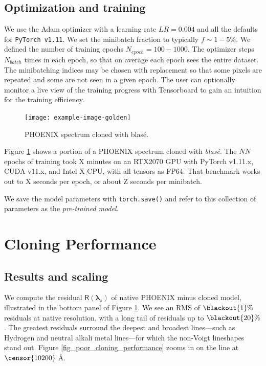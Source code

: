 \documentclass[modern]{aastex631}
\begin{document}
\subsection{Optimization and training}

We use the Adam optimizer with a learning rate $LR=0.004$ and all the defaults for \texttt{PyTorch v1.11}.  We set the minibatch fraction to typically $f\sim1-5\%$.  We defined the number of training epochs $N_{epoch}=100-1000$.  The optimizer steps $N_{batch}$ times in each epoch, so that on average each epoch sees the entire dataset.  The minibatching indices may be chosen with replacement so that some pixels are repeated and some are not seen in a given epoch.  The user can optionally monitor a live view of the training progress with Tensorboard to gain an intuition for the training efficiency.


\begin{figure}[hbt!]
  \centering
  \texttt{[image: example-image-golden]}
  \caption{PHOENIX spectrum cloned with blas\'e.}
  \label{fig_cloned_spectrum_demo}
\end{figure}

Figure \ref{fig_cloned_spectrum_demo} shows a portion of a PHOENIX spectrum cloned with \emph{blas\'e}.  The $NN$ epochs of training took X minutes on an RTX2070 GPU with PyTorch v1.11.x, CUDA v11.x, and Intel X CPU, with all tensors as FP64.  That benchmark works out to X seconds per epoch, or about Z seconds per minibatch.

We save the model parameters with \texttt{torch.save()} and refer to this collection of parameters as the \emph{pre-trained model}.

\section{Cloning Performance}

\subsection{Results and scaling}

We compute the residual $\mathsf{R}(\bm{\lambda}_s)$ of native PHOENIX minus cloned model, illustrated in the bottom panel of Figure \ref{fig_cloned_spectrum_demo}.  We see an RMS of $\blackout{1}\%$ residuals at native resolution, with a long tail of residuals up to $\blackout{20}\%$.  The greatest residuals surround the deepest and broadest lines---such as Hydrogen and neutral alkali metal lines---for which the non-Voigt lineshapes stand out.  Figure \ref{fig_poor_cloning_performance} zooms in on the  line at $\censor{10200}\;$\AA.
\end{document}
